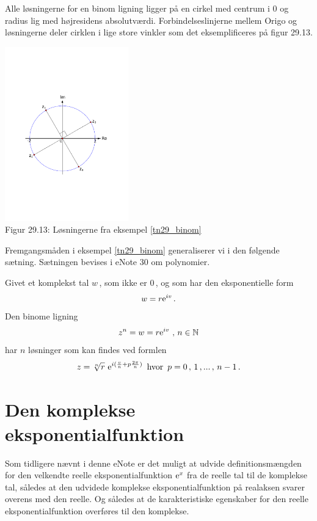 Alle løsningerne for en binom ligning ligger på en cirkel med centrum i $0$ og radius lig med højresidens absolutværdi.  Forbindelseslinjerne mellem Origo og løsningerne deler cirklen i lige store vinkler som det eksemplificeres på figur 29.13. 

\begin{center}
	\includegraphics[trim=3cm 7.8cm 3cm 9.2cm,width=0.4\textwidth,clip]{Geometer/4lsn.pdf}\\
Figur 29.13: Løsningerne fra eksempel \ref{tn29_binom}
\end{center}


Fremgangsmåden i eksempel \ref{tn29_binom} generaliserer vi i den følgende sætning. Sætningen bevises i eNote 30 om polynomier.

\begin{theorem}
Givet et komplekst tal $w\,$, som ikke er $0\,$, og som har den eksponentielle form
$$w=r\mathrm{e}^{iv}\,.$$
Den binome ligning
\begin{equation}
z^n=w=r\mathrm{e}^{iv}\,\,,\,n\in \mathbb N
\end{equation}
har $n$ løsninger som kan findes ved formlen
\begin{equation}
z=\sqrt[n]{r}\,\,\mathrm{e}^{i(\frac vn+p\frac{2\pi}n)}\,\,\,\mathrm{hvor} \,\,\,
p=0\,,\,1\,,...\,,\,n-1\,.
\end{equation}
\end{theorem}
\section{Den komplekse eksponentialfunktion}

Som tidligere nævnt i denne eNote er det muligt at udvide  definitionsmængden for den velkendte reelle eksponentialfunktion $\mathrm{e}^x$ fra de reelle tal til de komplekse tal, således at den udvidede komplekse eksponentialfunktion på realaksen svarer overens med den reelle. Og således at de karakteristiske egenskaber for den reelle eksponentialfunktion overføres til den komplekse. 

